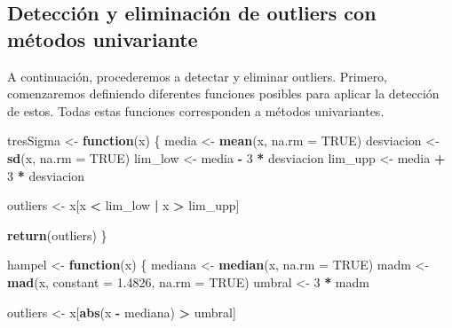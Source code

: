 \documentclass[notspecified,article,submit,moreauthors,pdftex]{Definitions/mdpi}
\newenvironment{Shaded}{\begin{snugshade}}{\end{snugshade}}
\newcommand{\AttributeTok}[1]{\textcolor[rgb]{0.13,0.29,0.53}{#1}}
\newcommand{\ConstantTok}[1]{\textcolor[rgb]{0.56,0.35,0.01}{#1}}
\newcommand{\ControlFlowTok}[1]{\textcolor[rgb]{0.13,0.29,0.53}{\textbf{#1}}}
\newcommand{\DecValTok}[1]{\textcolor[rgb]{0.00,0.00,0.81}{#1}}
\newcommand{\FloatTok}[1]{\textcolor[rgb]{0.00,0.00,0.81}{#1}}
\newcommand{\FunctionTok}[1]{\textcolor[rgb]{0.13,0.29,0.53}{\textbf{#1}}}
\newcommand{\NormalTok}[1]{#1}
\newcommand{\OtherTok}[1]{\textcolor[rgb]{0.56,0.35,0.01}{#1}}
\newcommand{\SpecialCharTok}[1]{\textcolor[rgb]{0.81,0.36,0.00}{\textbf{#1}}}
\begin{document}
\hypertarget{detecciuxf3n-y-eliminaciuxf3n-de-outliers-con-muxe9todos-univariante}{%
\subsection{Detección y eliminación de outliers con métodos
univariante}\label{detecciuxf3n-y-eliminaciuxf3n-de-outliers-con-muxe9todos-univariante}}

A continuación, procederemos a detectar y eliminar outliers. Primero,
comenzaremos definiendo diferentes funciones posibles para aplicar la
detección de estos. Todas estas funciones corresponden a métodos
univariantes.

\begin{Shaded}
\begin{Highlighting}[]
\NormalTok{tresSigma }\OtherTok{\textless{}{-}} \ControlFlowTok{function}\NormalTok{(x) \{}
\NormalTok{  media }\OtherTok{\textless{}{-}} \FunctionTok{mean}\NormalTok{(x, }\AttributeTok{na.rm =} \ConstantTok{TRUE}\NormalTok{)}
\NormalTok{  desviacion }\OtherTok{\textless{}{-}} \FunctionTok{sd}\NormalTok{(x, }\AttributeTok{na.rm =} \ConstantTok{TRUE}\NormalTok{)}
\NormalTok{  lim\_low }\OtherTok{\textless{}{-}}\NormalTok{ media }\SpecialCharTok{{-}} \DecValTok{3} \SpecialCharTok{*}\NormalTok{ desviacion}
\NormalTok{  lim\_upp }\OtherTok{\textless{}{-}}\NormalTok{ media }\SpecialCharTok{+} \DecValTok{3} \SpecialCharTok{*}\NormalTok{ desviacion}
  
\NormalTok{  outliers }\OtherTok{\textless{}{-}}\NormalTok{ x[x }\SpecialCharTok{\textless{}}\NormalTok{ lim\_low }\SpecialCharTok{|}\NormalTok{ x }\SpecialCharTok{\textgreater{}}\NormalTok{ lim\_upp]}
  
  \FunctionTok{return}\NormalTok{(outliers)}
\NormalTok{\}}

\NormalTok{hampel }\OtherTok{\textless{}{-}} \ControlFlowTok{function}\NormalTok{(x) \{}
\NormalTok{  mediana }\OtherTok{\textless{}{-}} \FunctionTok{median}\NormalTok{(x, }\AttributeTok{na.rm =} \ConstantTok{TRUE}\NormalTok{)}
\NormalTok{  madm }\OtherTok{\textless{}{-}} \FunctionTok{mad}\NormalTok{(x, }\AttributeTok{constant =} \FloatTok{1.4826}\NormalTok{, }\AttributeTok{na.rm =} \ConstantTok{TRUE}\NormalTok{)}
\NormalTok{  umbral }\OtherTok{\textless{}{-}} \DecValTok{3} \SpecialCharTok{*}\NormalTok{ madm}
  
\NormalTok{  outliers }\OtherTok{\textless{}{-}}\NormalTok{ x[}\FunctionTok{abs}\NormalTok{(x }\SpecialCharTok{{-}}\NormalTok{ mediana) }\SpecialCharTok{\textgreater{}}\NormalTok{ umbral]}
  

\end{Highlighting}
\end{Shaded}
\end{document}
